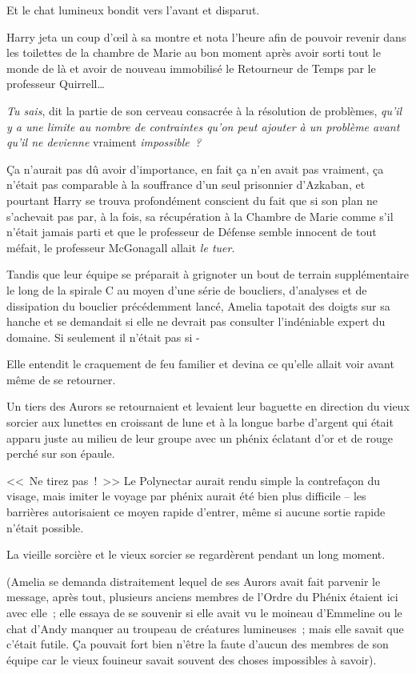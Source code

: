 Et le chat lumineux bondit vers l'avant et disparut.

Harry jeta un coup d'œil à sa montre et nota l'heure afin de pouvoir revenir dans les toilettes de la chambre de Marie au bon moment après avoir sorti tout le monde de là et avoir de nouveau immobilisé le Retourneur de Temps par le professeur Quirrell…

\emph{Tu sais}, dit la partie de son cerveau consacrée à la résolution de problèmes, \emph{qu'il y a une limite au nombre de contraintes qu'on peut ajouter à un problème avant qu'il ne devienne} vraiment \emph{impossible~?}

Ça n'aurait pas dû avoir d'importance, en fait ça n'en avait pas vraiment, ça n'était pas comparable à la souffrance d'un seul prisonnier d'Azkaban, et pourtant Harry se trouva profondément conscient du fait que si son plan ne s'achevait pas par, à la fois, sa récupération à la Chambre de Marie comme s'il n'était jamais parti et que le professeur de Défense semble innocent de tout méfait, le professeur McGonagall allait \emph{le tuer}.

\later

Tandis que leur équipe se préparait à grignoter un bout de terrain supplémentaire le long de la spirale C au moyen d'une série de boucliers, d'analyses et de dissipation du bouclier précédemment lancé, Amelia tapotait des doigts sur sa hanche et se demandait si elle ne devrait pas consulter l'indéniable expert du domaine. Si seulement il n'était pas si -

Elle entendit le craquement de feu familier et devina ce qu'elle allait voir avant même de se retourner.

Un tiers des Aurors se retournaient et levaient leur baguette en direction du vieux sorcier aux lunettes en croissant de lune et à la longue barbe d'argent qui était apparu juste au milieu de leur groupe avec un phénix éclatant d'or et de rouge perché sur son épaule.

<<~Ne tirez pas~!~>> Le Polynectar aurait rendu simple la contrefaçon du visage, mais imiter le voyage par phénix aurait été bien plus difficile -- les barrières autorisaient ce moyen rapide d'entrer, même si aucune sortie rapide n'était possible.

La vieille sorcière et le vieux sorcier se regardèrent pendant un long moment.

(Amelia se demanda distraitement lequel de ses Aurors avait fait parvenir le message, après tout, plusieurs anciens membres de l'Ordre du Phénix étaient ici avec elle~; elle essaya de se souvenir si elle avait vu le moineau d'Emmeline ou le chat d'Andy manquer au troupeau de créatures lumineuses~; mais elle savait que c'était futile. Ça pouvait fort bien n'être la faute d'aucun des membres de son équipe car le vieux fouineur savait souvent des choses impossibles à savoir).

